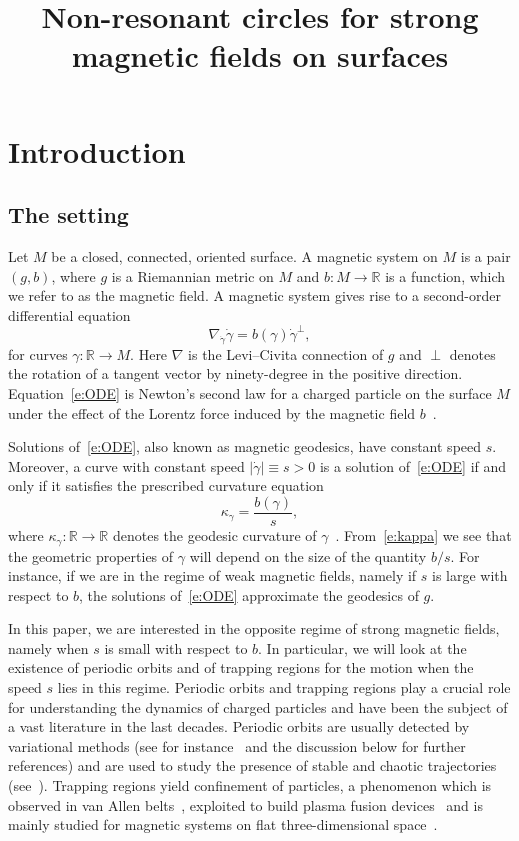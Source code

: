 \documentclass[AHL,Unicode,longabstracts,published]{cedram}
\title[Non-resonant circles for strong magnetic fields on surfaces]{Non-resonant circles for strong magnetic fields on surfaces}
\author[\initial{L.} \lastname{Asselle}]{\firstname{Luca} \lastname{Asselle}}
\author[\initial{G.} \lastname{Benedetti}]{\firstname{Gabriele} \lastname{Benedetti}}
\newcommand{\R}{\mathbb{R}}
\begin{document}
\maketitle


\section{Introduction}
\subsection{The setting}
Let $M$ be a closed, connected, oriented surface. A magnetic system on $M$ is a pair $(g,b)$, where $g$ is a Riemannian metric on $M$ and $b:M\to\R$ is a function, which we refer to as the magnetic field. A magnetic system gives rise to a second-order differential equation
\begin{equation}\label{e:ODE}
\nabla_{\dot\gamma}\dot\gamma=b(\gamma)\dot\gamma^\perp,
\end{equation}
for curves $\gamma:\R\to M$. Here $\nabla$ is the Levi--Civita connection of $g$ and $\perp$ denotes the rotation of a tangent vector by ninety-degree in the positive direction. Equation~\eqref{e:ODE} is Newton's second law for a charged particle on the surface $M$ under the effect of the Lorentz force induced by the magnetic field $b$~\cite{AS67,Arn61}.

Solutions of~\eqref{e:ODE}, also known as magnetic geodesics, have constant speed $s$. Moreover, a curve with constant speed $|\dot\gamma|\equiv s>0$ is a solution of~\eqref{e:ODE} if and only if it satisfies the prescribed curvature equation
\begin{equation}\label{e:kappa}
\kappa_\gamma=\frac{b(\gamma)}{s},
\end{equation}
where $\kappa_\gamma:\R\to\R$ denotes the geodesic curvature of $\gamma$~\cite{Arn61,AS67}. From~\eqref{e:kappa} we see that the geometric properties of $\gamma$ will depend on the size of the quantity $b/s$. For instance, if we are in the regime of weak magnetic fields, namely if $s$ is large with respect to $b$, the solutions of~\eqref{e:ODE} approximate the geodesics of $g$.

In this paper, we are interested in the opposite regime of strong magnetic fields, namely when $s$ is small with respect to $b$. In particular, we will look at the existence of periodic orbits and of trapping regions for the motion when the speed $s$ lies in this regime. Periodic orbits and trapping regions play a crucial role for understanding the dynamics of charged particles and have been the subject of a vast literature in the last decades. Periodic orbits are usually detected by variational methods (see for instance~\cite{Benedetti:2016b,Ginzburg:1994,Taimanov:1992fs} and the discussion below for further references) and are used to study the presence of stable and chaotic trajectories (see~\cite{Abreu:2017,Miranda:2007}). Trapping regions yield confinement of particles, a phenomenon which is observed in van Allen belts~\cite{Braun}, exploited to build plasma fusion devices~\cite{HM} and is mainly studied for magnetic systems on flat three-dimensional space~\cite{Peralta,Truc}.
\end{document}
